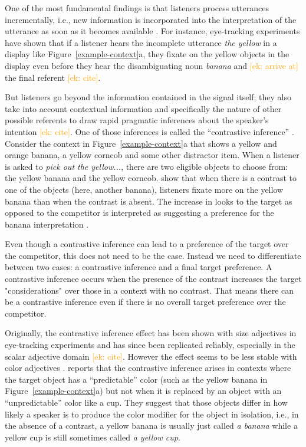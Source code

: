 \documentclass[10pt,letterpaper]{article}
\newcommand{\ek}[1]{\textcolor{Orange}{[ek: #1]}}
\begin{document}
One of the most fundamental findings is that listeners process utterances incrementally, i.e., new information is incorporated into the interpretation of the utterance as soon as it becomes available \cite{Eberhard:1995}. For instance, eye-tracking experiments have shown that if a listener hears the incomplete utterance \textit{the yellow} in a display like Figure~\ref{example-context}a, they fixate on the yellow objects in the display even before they hear the disambiguating noun \textit{banana} and \ek{arrive at} the final referent \ek{cite}.

But listeners go beyond the information contained in the signal itself; they also take into account contextual information and specifically the nature of other possible referents to draw rapid pragmatic inferences about the speaker's intention \ek{cite}. One of those inferences is called the ``contrastive inference'' \cite{Sedivy:1999}. Consider the context in Figure~\ref{example-context}a that shows a yellow and orange banana, a yellow corncob and some other distractor item. When a listener is asked to \textit{pick out the yellow...}, there are two eligible objects to choose from: the yellow banana and the yellow corncob.  show that when there is a contrast to one of the objects (here, another banana), listeners fixate more on the yellow banana than when the contrast is absent. The increase in looks to the target as opposed to the competitor is interpreted as suggesting a preference for the banana interpretation \cite{Eberhard:1995}. 

Even though a contrastive inference can lead to a preference of the target over the competitor, this does not need to be the case. Instead we need to differentiate between two cases: a contrastive inference and a final target preference. A contrastive inference occurs when the presence of the contrast increases the target "considerations" over those in a context with no contrast. That means there can be a contrastive inference even if there is no overall target preference over the competitor.

Originally, the contrastive inference effect has been shown with size adjectives in eye-tracking experiments \cite{Sedivy:1999} and has since been replicated reliably, especially in the scalar adjective domain \ek{cite}. However the effect seems to be less stable with color adjectives \cite{Sedivy:2003}.  reports that the contrastive inference arises in contexts where the target object has a ``predictable'' color (such as the yellow banana in Figure~\ref{example-context}a) but not when it is replaced by an object with an ``unpredictable'' color like a cup. 
They suggest that those objects differ in how likely a speaker is to produce the color modifier for the object in isolation, i.e., in the absence of a contrast, a yellow banana is usually just called \textit{a banana} while a yellow cup is still sometimes called \textit{a yellow cup}.
\end{document}
